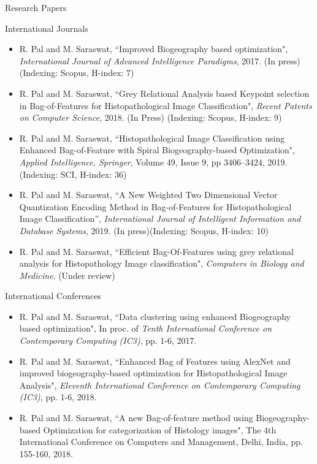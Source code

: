 \documentclass [9pt,times] {beamer}
\begin{document}
\begin{frame}{Research Papers}
\begin{block}{International Journals}
	
\begin{itemize}
	\scriptsize
\justifying
	\item R. Pal and M. Saraswat, ``Improved Biogeography based optimization", \emph{International Journal of Advanced Intelligence Paradigms}, 2017. (In press) (Indexing: Scopus, H-index: 7)
	
	\item R. Pal and M. Saraswat, ``Grey Relational Analysis based Keypoint selection in Bag-of-Features for Histopathological Image Classification", \emph{Recent Patents on Computer Science}, 2018. (In Press) (Indexing: Scopus, H-index: 9)
	
	\item R. Pal and M. Saraswat, ``Histopathological Image Classification using Enhanced Bag-of-Feature with Spiral Biogeography-based Optimization", \emph{Applied Intelligence, Springer}, Volume 49, Issue 9, pp 3406–3424, 2019. (Indexing: SCI, H-index: 36)

\item   R. Pal and M. Saraswat, ``A New Weighted Two Dimensional Vector Quantization Encoding Method in Bag-of-Features for Histopathological Image Classification'', \emph{International Journal of Intelligent Information and Database Systems}, 2019. (In press)(Indexing: Scopus, H-index: 10)
 
	\item  R. Pal and M. Saraswat, ``Efficient Bag-Of-Features using grey relational analysis for Histopathology Image classification", \emph{Computers in Biology and Medicine}. (Under review)
\end{itemize}
\end{block}

\begin{block}{International Conferences}
	
\begin{itemize}
	\scriptsize
\justifying
	\item R. Pal and M. Saraswat, ``Data clustering using enhanced Biogeography based optimization", In proc. of \emph{Tenth International Conference on Contemporary Computing (IC3)}, pp. 1-6, 2017.
	
	\item R. Pal and M. Saraswat, ``Enhanced Bag of Features using AlexNet and improved biogeography-based optimization for Histopathological Image Analysis", \emph{Eleventh International Conference on Contemporary Computing (IC3)}, pp. 1-6, 2018.
	
	\item R. Pal and M. Saraswat, ``A new Bag-of-feature method using Biogeography-based Optimization for categorization of Histology images", The 4th International Conference on Computers and Management,  Delhi, India, pp. 155-160, 2018.
	
\end{itemize}	
\end{block}
\end{frame}
\end{document}
